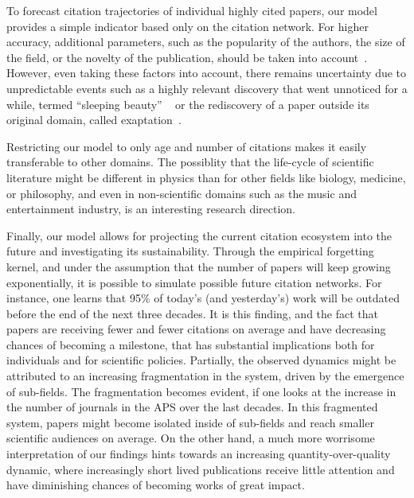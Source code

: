 \documentclass[draft,final]{vutinfth} %
\begin{document}
To forecast citation trajectories of individual highly cited papers, our model provides a simple indicator based only on the citation network. For higher accuracy, additional parameters, such as the popularity of the authors, the size of the field, or the novelty of the publication, should be taken into account~\cite{ST2020, Klimek2016, Newman2009x, Martin2013, Newman_2014x, Acuna2012, Shen2014, Sinatra2016, Wang2013}. However, even taking these factors into account, there remains uncertainty due to unpredictable events such as a highly relevant discovery that went unnoticed for a while, termed ``sleeping beauty'' ~\cite{vanRaan2004} or the rediscovery of a paper outside its original domain, called exaptation~\cite{ferreira2020}.

Restricting our model to only age and number of citations makes it easily transferable to other domains. The possiblity that the life-cycle of scientific literature might be different in physics than for other fields like biology, medicine, or philosophy, and even in non-scientific domains such as the music and entertainment industry, is an interesting research direction.

Finally, our model allows for projecting the current citation ecosystem into the future and investigating its sustainability. Through the empirical forgetting kernel, and under the assumption that the number of papers will keep growing exponentially, it is possible to simulate possible future citation networks. For instance, one learns that 95\% of today's (and yesterday's) work will be outdated before the end of the next three decades. It is this finding, and the fact that papers are receiving fewer and fewer citations on average and have decreasing chances of becoming a milestone, that has substantial implications both for individuals and for scientific policies. Partially, the observed dynamics might be attributed to an increasing fragmentation in the system, driven by the emergence of sub-fields. The fragmentation becomes evident, if one looks at the increase in the number of journals in the APS over the last decades. In this fragmented system, papers might become isolated inside of sub-fields and reach smaller scientific audiences on average. On the other hand, a much more worrisome interpretation of our findings hints towards an increasing quantity-over-quality dynamic, where increasingly short lived publications receive little attention and have diminishing chances of becoming works of great impact.

\newpage
\end{document}
